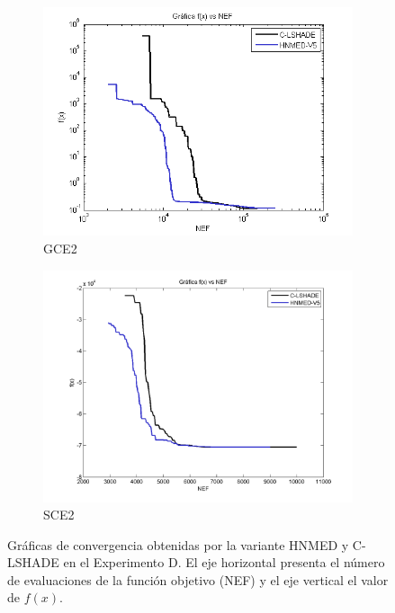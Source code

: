 \begin{figure}
\begin{subfigure}[b]{0.49\linewidth}
		\includegraphics[width=\linewidth]{Figures/D-Grafica_Convergencia_Problema_5}
		\caption{GCE2} \label{fig:G2} 
	\end{subfigure}
	\begin{subfigure}[b]{0.49\linewidth}
		\includegraphics[width=\linewidth]{Figures/D-Grafica_Convergencia_Problema_6}
		\caption{SCE2} \label{fig:S1} 
	\end{subfigure}
	\caption[Gráficas de convergencia obtenidas por la variante HNMED-V5 y C-LSHADE en el Experimento D.]{Gráficas de convergencia obtenidas por la variante HNMED y C-LSHADE en el Experimento D. El eje horizontal presenta el número de evaluaciones de la función objetivo (NEF) y el eje vertical el valor de  $f(x)$.} \label{fig: Gráficas de convergencia obtenidas por HNMED-V5 y CLSHADE para el Experimento D} 
	
\end{figure}

